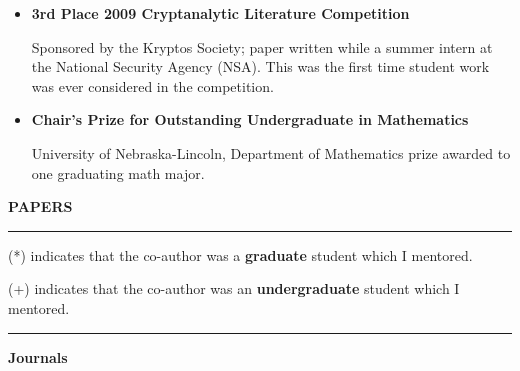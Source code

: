 \documentclass{article}
\begin{document}
\begin{itemize}
		\item \textbf{3rd Place 2009 Cryptanalytic Literature Competition}

		Sponsored by the Kryptos Society; paper written while a summer intern at the National Security Agency (NSA).
		This was the first time student work was ever considered in the competition.

		\item \textbf{Chair's Prize for Outstanding Undergraduate in Mathematics}

		University of Nebraska-Lincoln, Department of Mathematics prize awarded to one graduating math major.


	\end{itemize}

\vspace{.25 in}



\noindent \LARGE \textbf{PAPERS}\normalsize

\noindent \rule{\textwidth}{1px}

\noindent (*) indicates that the co-author was a \textbf{graduate} student which I mentored.

\noindent (+) indicates that the co-author was an \textbf{undergraduate} student which I mentored.

\noindent \rule{\textwidth}{1px}

\medskip

\noindent \Large \textbf{Journals} \normalsize

\medskip
\end{document}

